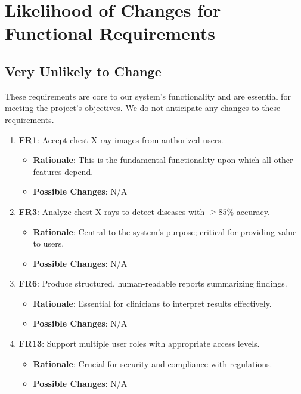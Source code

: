 \documentclass[12pt]{article}
\begin{document}
  
\clearpage
\section{Likelihood of Changes for Functional Requirements}

\subsection{Very Unlikely to Change}

These requirements are core to our system's functionality and are essential for meeting the project's objectives. We do not anticipate any changes to these requirements.

\begin{enumerate}
    \item \textbf{FR1}: Accept chest X-ray images from authorized users.
    \begin{itemize}[label=-]
        \item \textbf{Rationale}: This is the fundamental functionality upon which all other features depend.
        \item \textbf{Possible Changes}: N/A
    \end{itemize}

    \item \textbf{FR3}: Analyze chest X-rays to detect diseases with $\geq85\%$ accuracy.
    \begin{itemize}[label=-]
        \item \textbf{Rationale}: Central to the system's purpose; critical for providing value to users.
        \item \textbf{Possible Changes}: N/A
    \end{itemize}

    \item \textbf{FR6}: Produce structured, human-readable reports summarizing findings.
    \begin{itemize}[label=-]
        \item \textbf{Rationale}: Essential for clinicians to interpret results effectively.
        \item \textbf{Possible Changes}: N/A
    \end{itemize}

    \item \textbf{FR13}: Support multiple user roles with appropriate access levels.
    \begin{itemize}[label=-]
        \item \textbf{Rationale}: Crucial for security and compliance with regulations.
        \item \textbf{Possible Changes}: N/A
    \end{itemize}
\end{enumerate}
\end{document}
